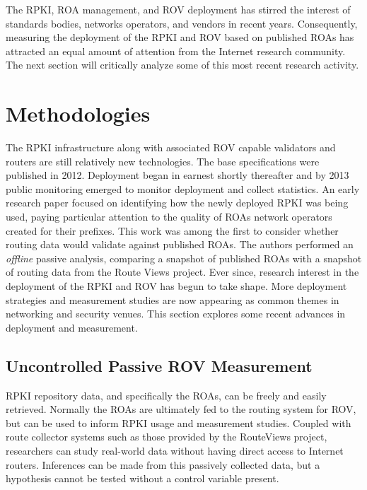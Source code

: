 \documentclass[sigconf]{acmart}
\begin{document}
The RPKI, ROA management, and ROV deployment has stirred the interest of
standards bodies, networks operators, and vendors in recent years.
Consequently, measuring the deployment of the RPKI and ROV based on
published ROAs has attracted an equal amount of attention from the
Internet research community.  The next section will critically analyze
some of this most recent research activity.

\section{Methodologies}\label{sec:Methodologies}

The RPKI infrastructure along with associated ROV capable validators
and routers are still relatively new technologies.  The base
specifications were published in 2012.  Deployment began in earnest
shortly thereafter and by 2013 public monitoring emerged to monitor
deployment and collect statistics.\cite{nist_rpki_2019}  An early
research paper focused on identifying how the newly deployed RPKI was
being used, paying particular attention to the quality of ROAs network
operators created for their prefixes.\cite{iamartino_measuring_2015}
This work was among the first to consider whether routing data would
validate against published ROAs.  The authors performed an
\emph{offline} passive analysis, comparing a snapshot of published ROAs
with a snapshot of routing data from the Route Views
project.\cite{oregon_routeviews_2019}  Ever since, research interest in
the deployment of the RPKI and ROV has begun to take shape.  More
deployment strategies and measurement studies are now appearing as
common themes in networking and security venues.  This section explores
some recent advances in deployment and measurement.

\subsection{Uncontrolled Passive ROV Measurement}

RPKI repository data, and specifically the ROAs, can be freely and
easily retrieved.  Normally the ROAs are ultimately fed to the routing
system for ROV, but can be used to inform RPKI usage and measurement
studies.  Coupled with route collector systems such as those provided by
the RouteViews project, researchers can study real-world data without
having direct access to Internet routers.  Inferences can be made from
this passively collected data, but a hypothesis cannot be tested without
a control variable present.
\end{document}
